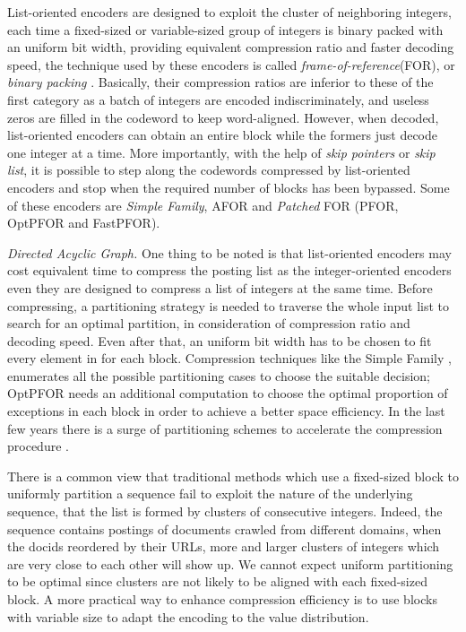 \documentclass[runningheads,a4paper]{llncs}
\begin{document}
List-oriented encoders are designed to exploit the cluster of neighboring integers, each time a fixed-sized or variable-sized group of integers is binary packed with an uniform bit width, providing equivalent compression ratio and faster decoding speed, the technique used by these encoders is called \textit{frame-of-reference}(FOR), or \textit{binary packing} \cite{goldstein1998compressing}.
Basically, their compression ratios are inferior to these of the first category as a batch of integers are encoded indiscriminately, and useless zeros are filled in the codeword to keep word-aligned.
However, when decoded, list-oriented encoders can obtain an entire block while the formers just decode one integer at a time.
More importantly, with the help of \textit{skip pointers} or \textit{skip list}, it is possible to step along the codewords compressed by list-oriented encoders and stop when the required number of blocks has been bypassed.
Some of these encoders are \textit{Simple Family}, AFOR and \textit{Patched} FOR (PFOR, OptPFOR and FastPFOR).

\textit{Directed Acyclic Graph.}
One thing to be noted is that list-oriented encoders may cost equivalent time to compress the posting list as the integer-oriented encoders even they are designed to compress a list of integers at the same time.
Before compressing, a partitioning strategy is needed to traverse the whole input list to search for an optimal partition, in consideration of compression ratio and decoding speed.
Even after that, an uniform bit width has to be chosen to fit every element in for each block.
Compression techniques like the Simple Family \cite{anh2005inverted,anh2010index}, enumerates all the possible partitioning cases to choose the suitable decision; OptPFOR \cite{yan2009inverted} needs an additional computation to choose the optimal proportion of exceptions in each block in order to achieve a better space efficiency.
In the last few years there is a surge of partitioning schemes to accelerate the compression procedure \cite{lemire2015decoding,ottaviano2014partitioned}.

There is a common view that traditional methods which use a fixed-sized block to uniformly partition a sequence fail to exploit the nature of the underlying sequence, that the list is formed by clusters of consecutive integers.
Indeed, the sequence contains postings of documents crawled from different domains, when the docids reordered by their URLs, more and larger clusters of integers which are very close to each other will show up.
We cannot expect uniform partitioning to be optimal since clusters are not likely to be aligned with each fixed-sized block.
A more practical way to enhance compression efficiency is to use blocks with variable size to adapt the encoding to the value distribution.
\end{document}
